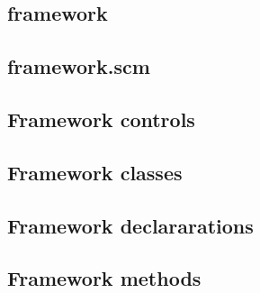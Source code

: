

\begin{landscape}
%
\subsection{framework}

\subsection{framework.scm}

%

%
%
%
%
%
%
%


\subsection{Framework controls}

\subsection{Framework classes}

\subsection{Framework declararations}

\subsection{Framework methods}









%





%





%

%

\end{landscape}


